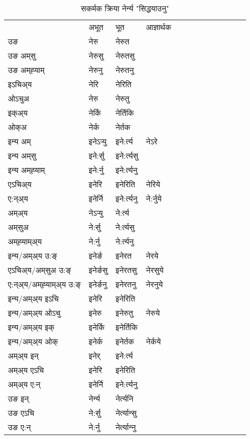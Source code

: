 \begin{table}[H]
\centering
\caption{\label{er.vt} सकर्मक क्रिया  नेर्न्य  "सिद्धयाउनु"  }
\begin{tabular}{l|l|l|l|l|l|l|l|l|l|l|l|l}  \toprule
&अभूत & भूत & आज्ञार्थक \\ 
उङ &नेरु &नेरुत \\ 
उङ अम्‌सु &नेरुसु &नेरुतसु \\ 
उङ अम्‌ह्‍याम् &नेरुनु &नेरुतनु \\ 
इऽचिअ्य &नेरि &नेरिति   \\ 
ओऽचुअ &नेरु &नेरुतु   \\ 
इक्अ्य &नेर्कि &नेर्तिकि   \\ 
ओक्अ &नेर्क &नेर्तक   \\ 
इन्य अम् & इनेऽर्‍यु  & इने:र्त्य &नेऽरे  \\ 
इन्य अम्‌सु & इने:र्सु  & इने:र्त्यसु   \\ 
इन्य अम्‌ह्‍याम् & इने:र्नु  & इने:र्त्यनु   \\ 
एऽचिअ्य & इनेरि & इनेरिति &नेरिये    \\ 
ए:न्अ्य & इनेर्नि  & इने:र्त्यनु &ने:र्नुये  \\ 
अम्अ्य & नेऽर्‍यु  & ने:र्त्य  \\ 
अम्‌सुअ & ने:र्सु & ने:र्त्यसु  \\ 
अम्‌ह्‍याम्अ्य & ने:र्नु  & ने:र्त्यनु \\ 
\midrule
इन्य/अम्अ्य उ:ङ्‌&इनेर्ङ & इनेरत &नेरये \\ 
एऽचिअ्य/अम्‌सुअ उ:ङ्‌ &इनेर्ङसु & इनेरतसु &नेरसुये \\ 
ए:न्अ्य/अम्‌ह्‍याम्अ्य उ:ङ्‌ &इनेर्ङनु & इनेरतनु &नेरनुये \\ 
इन्य/अम्अ्य इऽचि & इनेरि & इनेरिति    \\ 
इन्य/अम्अ्य ओऽचु & इनेरु & इनेरुतु  &नेरुये  \\ 
इन्य/अम्अ्य इक् & इनेर्कि & इनेर्तिकि   \\ 
इन्य/अम्अ्य ओक् & इनेर्क & इनेर्तक  &नेर्कये  \\ 
अम्अ्य इन् & इनेर् & इने:र्त्य   \\ 
अम्अ्य एऽचि & इनेरि & इनेरिति    \\ 
अम्अ्य ए:न् & इनेर्नि  & इने:र्त्यनु  \\ 
\midrule
उङ इन् & नेर्न्य  & नेर्त्यनि  \\ 
उङ एऽचि & ने:र्सु  & नेर्त्यान्सु   \\ 
उङ ए:न्& ने:र्नु  & नेर्त्यान्‍नु   \\ 
\bottomrule
\end{tabular}
\end{table}


